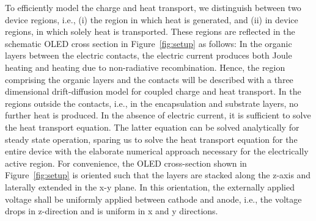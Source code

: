 \documentclass[%
9pt,
 aip,
rsi,%
 amsmath,amssymb,
preprint,%
]{revtex4-1}
\begin{document}
To efficiently model the charge and heat transport, we distinguish between two device regions, i.e., (i) the region in which heat is generated, and (ii) in device regions, in which solely heat is transported. 
These regions are reflected in the schematic OLED cross section in Figure~\ref{fig:setup} as follows:
In the organic layers between the electric contacts, the electric current produces both Joule heating and heating due to non-radiative recombination. 
Hence, the region comprising the organic layers and the contacts will be described with a three dimensional drift-diffusion model for coupled charge and heat transport.
In the regions outside the contacts, i.e., in the encapsulation and substrate layers, no further heat is produced. 
In the absence of electric current, it is sufficient to solve the heat transport equation.
The latter equation can be solved analytically for steady state operation, sparing us to solve the heat transport equation for the entire device with the  elaborate numerical approach necessary for the electrically active region.
For convenience, the OLED cross-section shown in Figure~\ref{fig:setup} is oriented such that the layers are stacked along the z-axis and laterally extended in the x-y plane.
In this orientation, the externally applied voltage shall be uniformly applied between cathode and anode, i.e., the voltage drops in z-direction and is uniform in x and y directions.
\end{document}
